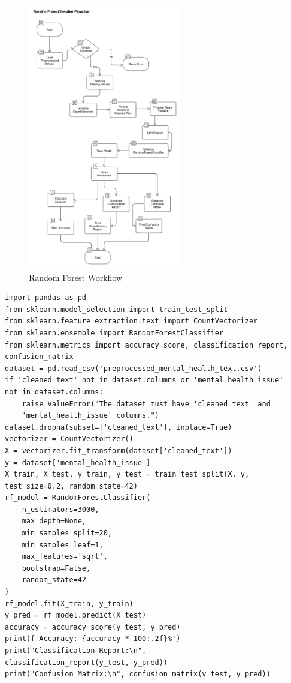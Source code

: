\begin{figure}[h!]  
    \centering
    \includegraphics[width=0.6\textwidth]{Images/Random Forest.png}  
    \caption{Random Forest Workflow}
    \label{Random Forest}  %
\end{figure}

\begin{verbatim}
import pandas as pd
from sklearn.model_selection import train_test_split
from sklearn.feature_extraction.text import CountVectorizer
from sklearn.ensemble import RandomForestClassifier
from sklearn.metrics import accuracy_score, classification_report, 
confusion_matrix
dataset = pd.read_csv('preprocessed_mental_health_text.csv')
if 'cleaned_text' not in dataset.columns or 'mental_health_issue' 
not in dataset.columns:
    raise ValueError("The dataset must have 'cleaned_text' and 
    'mental_health_issue' columns.")
dataset.dropna(subset=['cleaned_text'], inplace=True)
vectorizer = CountVectorizer()
X = vectorizer.fit_transform(dataset['cleaned_text'])
y = dataset['mental_health_issue']
X_train, X_test, y_train, y_test = train_test_split(X, y, 
test_size=0.2, random_state=42)
rf_model = RandomForestClassifier(
    n_estimators=3000,
    max_depth=None,
    min_samples_split=20,
    min_samples_leaf=1,
    max_features='sqrt',
    bootstrap=False,
    random_state=42
)
rf_model.fit(X_train, y_train)
y_pred = rf_model.predict(X_test)
accuracy = accuracy_score(y_test, y_pred)
print(f'Accuracy: {accuracy * 100:.2f}%')
print("Classification Report:\n", 
classification_report(y_test, y_pred))
print("Confusion Matrix:\n", confusion_matrix(y_test, y_pred))
\end{verbatim}

